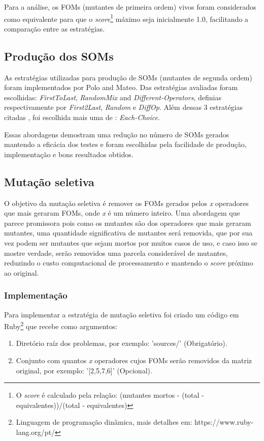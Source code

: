Para a análise, os FOMs (mutantes de primeira ordem) vivos foram considerados como equivalente para
que o \textit{score}\footnote{O \textit{score} é calculado pela relação: 
(mutantes mortos - (total - equivalentes))/(total - equivalentes)} máximo 
seja inicialmente 1.0, facilitando a comparação entre as estratégias.

\subsection{Produção dos SOMs}
As estratégias utilizadas para produção de SOMs (mutantes de segunda ordem) foram implementados por
Polo\cite{polo2009decreasing} and Mateo\cite{reales2013validating}. Das
estratégias avaliadas foram escolhidas: \textit{FirstToLast}, 
\textit{RandomMix} and \textit{Different-Operators}, definias 
respectivamente por \textit{First2Last}, \textit{Random} e
\textit{DiffOp}. Além dessas 3 estratégias citadas , foi escolhida mais
uma de \cite{reales2013validating}: \textit{Each-Choice}.

Essas abordagens demostram uma redução no número de SOMs gerados
mantendo a eficácia dos testes e foram escolhidas pela facilidade
de produção, implementação e bons resultados obtidos.

\subsection{Mutação seletiva}
O objetivo da mutação seletiva é remover os FOMs gerados pelos \textit{x} 
operadores que mais geraram FOMs, onde \textit{x} é um número inteiro. Uma
abordagem que parece promissora pois como os mutantes são dos operadores 
que mais geraram mutantes, uma quantidade significativa de mutantes
será removida, que por sua vez podem ser mutantes que sejam mortos por muitos
casos de uso, e caso isso se mostre verdade, serão removidos uma parcela
considerável de mutantes, reduzindo o custo computacional de processamento
e mantendo o \textit{score} próximo ao original.

\subsubsection{Implementação}
Para implementar a estratégia de mutação seletiva foi criado um código
em Ruby\footnote{Linguagem de programação dinâmica, mais detalhes 
em: https://www.ruby-lang.org/pt/} que recebe como argumentos:
\begin{enumerate}
\item Diretório raíz dos problemas, por exemplo: 'sources/' (Obrigatório).
\item Conjunto com quantos \textit{x} operadores cujos FOMs serão removidos da 
matriz original, por exemplo: '[2,5,7,6]' (Opcional).
\end{enumerate}

